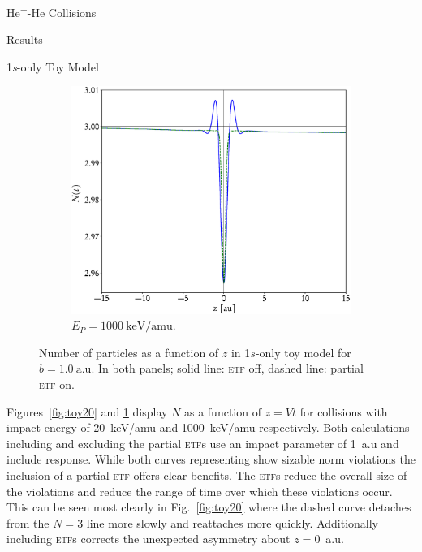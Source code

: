 \documentclass[letterpaper, 11 pt]{report}
\begin{document}
\begin{chapter}{\texorpdfstring{He\textsuperscript{+}}{He+}-He Collisions \label{chap:hephe}}
\begin{section}{Results \label{sec:hephe-disc}}
\begin{subsection}{1\textit{s}-only Toy Model \label{sec:toy}}
\begin{figure}[t]
\begin{subfigure}{.5\textwidth}
               \includegraphics[width=\linewidth]{./images/toymodel/dNorm-1s-1000.eps}
               \caption{$E_P = 1000~\mathrm{keV}/\mathrm{amu}$. \label{fig:toy1000}}
            \end{subfigure}
            \caption[Number of particles as a function of \textit{z} in 1\textit{s}-only toy model]
                    {Number of particles as a function of $z$ in 1$s$-only toy model for $b = 1.0~
                    \mathrm{a.u}$. In both panels; solid line: \textsc{etf} off, dashed line:
                    partial \textsc{etf} on. \label{fig:toy}}
         \end{figure}

         Figures~\ref{fig:toy20} and \ref{fig:toy1000} display $N$ as a function of $z = Vt$ for
         collisions with impact energy of 20~keV/amu and 1000~keV/amu respectively. Both calculations
         including and excluding the partial \textsc{etf}s use an impact parameter of 1~a.u and include
         response. While both curves representing show sizable norm violations the inclusion of a
         partial \textsc{etf} offers clear benefits. The \textsc{etf}s reduce the overall size of the
         violations and reduce the range of time over which these violations occur. This can be seen
         most clearly in Fig.~\ref{fig:toy20} where the dashed curve detaches from the $N = 3$ line more
         slowly and reattaches more quickly. Additionally including \textsc{etf}s corrects the
         unexpected asymmetry about $z = 0$~a.u.


\end{subsection}
\end{section}
\end{chapter}
\end{document}
